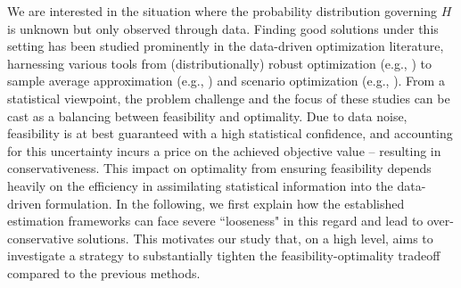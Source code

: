 \documentclass[mnsc,blindrev]{informs4} %
\begin{document}
We are interested in the situation where the probability distribution governing $H$ is unknown but only observed through data. Finding good solutions under this setting has been studied prominently in the data-driven optimization literature, harnessing various tools from (distributionally) robust optimization (e.g., \cite{bertsimas2011theory,ben2009robust,wiesemann2014distributionally}) to sample average approximation (e.g., \cite{shapiro2009lectures}) and scenario optimization (e.g., \cite{campi2008exact}). From a statistical viewpoint, the problem challenge and the focus of these studies can be cast as a balancing between feasibility and optimality. Due to data noise, feasibility is at best guaranteed with a high statistical confidence, and accounting for this uncertainty incurs a price on the achieved objective value -- resulting in conservativeness. This impact on optimality from ensuring feasibility depends heavily on the efficiency in assimilating statistical information into the data-driven formulation. In the following, we first explain how the established estimation frameworks can face severe ``looseness" in this regard and lead to over-conservative solutions. This motivates our study that, on a high level, aims to investigate a strategy to substantially tighten the feasibility-optimality tradeoff compared to the previous methods.



\end{document}
